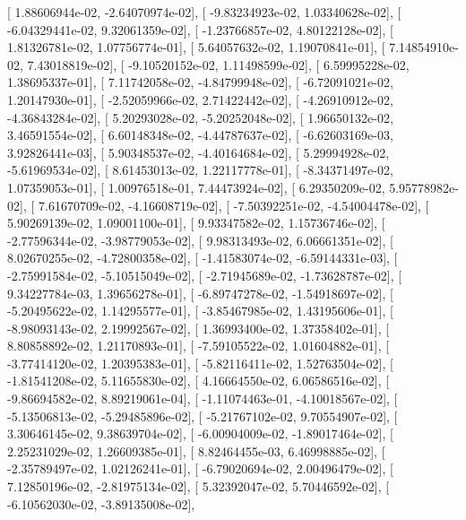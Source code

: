 \documentclass{article}
\begin{document}
       [  1.88606944e-02,  -2.64070974e-02],
       [ -9.83234923e-02,   1.03340628e-02],
       [ -6.04329441e-02,   9.32061359e-02],
       [ -1.23766857e-02,   4.80122128e-02],
       [  1.81326781e-02,   1.07756774e-01],
       [  5.64057632e-02,   1.19070841e-01],
       [  7.14854910e-02,   7.43018819e-02],
       [ -9.10520152e-02,   1.11498599e-02],
       [  6.59995228e-02,   1.38695337e-01],
       [  7.11742058e-02,  -4.84799948e-02],
       [ -6.72091021e-02,   1.20147930e-01],
       [ -2.52059966e-02,   2.71422442e-02],
       [ -4.26910912e-02,  -4.36843284e-02],
       [  5.20293028e-02,  -5.20252048e-02],
       [  1.96650132e-02,   3.46591554e-02],
       [  6.60148348e-02,  -4.44787637e-02],
       [ -6.62603169e-03,   3.92826441e-03],
       [  5.90348537e-02,  -4.40164684e-02],
       [  5.29994928e-02,  -5.61969534e-02],
       [  8.61453013e-02,   1.22117778e-01],
       [ -8.34371497e-02,   1.07359053e-01],
       [  1.00976518e-01,   7.44473924e-02],
       [  6.29350209e-02,   5.95778982e-02],
       [  7.61670709e-02,  -4.16608719e-02],
       [ -7.50392251e-02,  -4.54004478e-02],
       [  5.90269139e-02,   1.09001100e-01],
       [  9.93347582e-02,   1.15736746e-02],
       [ -2.77596344e-02,  -3.98779053e-02],
       [  9.98313493e-02,   6.06661351e-02],
       [  8.02670255e-02,  -4.72800358e-02],
       [ -1.41583074e-02,  -6.59144331e-03],
       [ -2.75991584e-02,  -5.10515049e-02],
       [ -2.71945689e-02,  -1.73628787e-02],
       [  9.34227784e-03,   1.39656278e-01],
       [ -6.89747278e-02,  -1.54918697e-02],
       [ -5.20495622e-02,   1.14295577e-01],
       [ -3.85467985e-02,   1.43195606e-01],
       [ -8.98093143e-02,   2.19992567e-02],
       [  1.36993400e-02,   1.37358402e-01],
       [  8.80858892e-02,   1.21170893e-01],
       [ -7.59105522e-02,   1.01604882e-01],
       [ -3.77414120e-02,   1.20395383e-01],
       [ -5.82116411e-02,   1.52763504e-02],
       [ -1.81541208e-02,   5.11655830e-02],
       [  4.16664550e-02,   6.06586516e-02],
       [ -9.86694582e-02,   8.89219061e-04],
       [ -1.11074463e-01,  -4.10018567e-02],
       [ -5.13506813e-02,  -5.29485896e-02],
       [ -5.21767102e-02,   9.70554907e-02],
       [  3.30646145e-02,   9.38639704e-02],
       [ -6.00904009e-02,  -1.89017464e-02],
       [  2.25231029e-02,   1.26609385e-01],
       [  8.82464455e-03,   6.46998885e-02],
       [ -2.35789497e-02,   1.02126241e-01],
       [ -6.79020694e-02,   2.00496479e-02],
       [  7.12850196e-02,  -2.81975134e-02],
       [  5.32392047e-02,   5.70446592e-02],
       [ -6.10562030e-02,  -3.89135008e-02],
\end{document}
